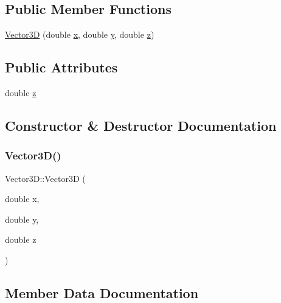 \subsection*{Public Member Functions}
\begin{DoxyCompactItemize}
\item 
\hyperlink{class_vector3_d_abd851542da40b1168edcad11fa83b7c2}{Vector3D} (double \hyperlink{class_vector2_d_ac5c4e553815737aa24bec8281270178f}{x}, double \hyperlink{class_vector2_d_ac38d0179cfe74c30fee290a703ab209a}{y}, double \hyperlink{class_vector3_d_a7321f3ff785f275c4d83f7d1b951752a}{z})
\end{DoxyCompactItemize}
\subsection*{Public Attributes}
\begin{DoxyCompactItemize}
\item 
double \hyperlink{class_vector3_d_a7321f3ff785f275c4d83f7d1b951752a}{z}
\end{DoxyCompactItemize}


\subsection{Constructor \& Destructor Documentation}
\mbox{\label{class_vector3_d_abd851542da40b1168edcad11fa83b7c2}} 
\subsubsection{\texorpdfstring{Vector3\+D()}{Vector3D()}}
{\footnotesize\ttfamily Vector3\+D\+::\+Vector3D (\begin{DoxyParamCaption}\item[{double}]{x,  }\item[{double}]{y,  }\item[{double}]{z }\end{DoxyParamCaption})\hspace{0.3cm}{\ttfamily [inline]}}



\subsection{Member Data Documentation}
\mbox{\label{class_vector3_d_a7321f3ff785f275c4d83f7d1b951752a}} 
